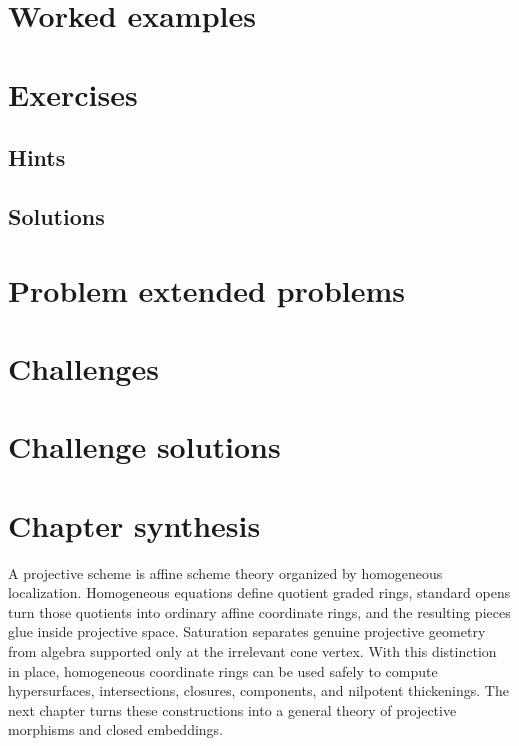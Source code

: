 \section{Worked examples}


\section{Exercises}


\ifdefined\IncludeExerciseHints
\subsection*{Hints}

\fi

\ifdefined\IncludeExerciseSolutions
\subsection*{Solutions}

\fi

\section{Problem extended problems}


\section{Challenges}


\ifdefined\IncludeChallengeSolutions
\section{Challenge solutions}

\fi

\section*{Chapter synthesis}
A projective scheme is affine scheme theory organized by homogeneous localization.  Homogeneous equations define quotient graded rings, standard opens turn those quotients into ordinary affine coordinate rings, and the resulting pieces glue inside projective space.  Saturation separates genuine projective geometry from algebra supported only at the irrelevant cone vertex.  With this distinction in place, homogeneous coordinate rings can be used safely to compute hypersurfaces, intersections, closures, components, and nilpotent thickenings.  The next chapter turns these constructions into a general theory of projective morphisms and closed embeddings.
